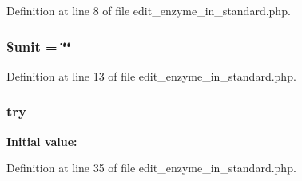 Definition at line 8 of file edit\-\_\-enzyme\-\_\-in\-\_\-standard.\-php.

\hypertarget{edit__enzyme__in__standard_8php_a1e32431b9d521850ce2aa78bc3af0040}{
\subsubsection[{\$unit}]{\setlength{\rightskip}{0pt plus 5cm}\$unit = \char`\"{}\char`\"{}}}\label{edit__enzyme__in__standard_8php_a1e32431b9d521850ce2aa78bc3af0040}


Definition at line 13 of file edit\-\_\-enzyme\-\_\-in\-\_\-standard.\-php.

\hypertarget{edit__enzyme__in__standard_8php_abe4cc9788f52e49485473dc699537388}{
\subsubsection[{try}]{\setlength{\rightskip}{0pt plus 5cm}try}}\label{edit__enzyme__in__standard_8php_abe4cc9788f52e49485473dc699537388}
{\bfseries Initial value\-:}


Definition at line 35 of file edit\-\_\-enzyme\-\_\-in\-\_\-standard.\-php.

